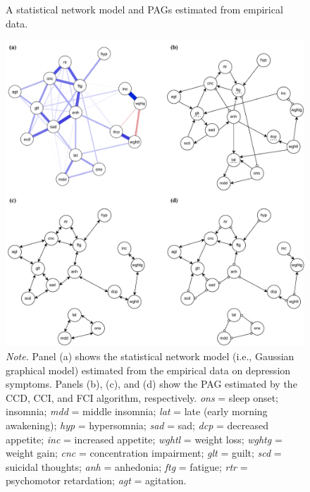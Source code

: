 \documentclass[twoside, 11pt]{article}
\begin{document}
\begin{figure}[!htbp]
    \centering
        \caption{A statistical network model and PAGs estimated from empirical data.}
        \vspace{1mm}
        \includegraphics[width=1\textwidth]{figures/Fig19.pdf}
        \vspace*{1mm}
        \caption*{\small{\textit{Note.} Panel (a) shows the statistical network model (i.e., Gaussian graphical model) estimated from the empirical data on depression symptoms. Panels (b), (c), and (d) show the PAG estimated by the CCD, CCI, and FCI algorithm, respectively. \textit{ons} = sleep onset; insomnia; \textit{mdd} = middle insomnia; \textit{lat} = late (early morning awakening); \textit{hyp} = hypersomnia; \textit{sad} = sad; \textit{dcp} = decreased appetite; \textit{inc} = increased appetite; \textit{wghtl} = weight loss; \textit{wghtg} = weight gain; \textit{cnc} = concentration impairment; \textit{glt} = guilt; \textit{scd} = suicidal thoughts; \textit{anh} = anhedonia; \textit{ftg} = fatigue; \textit{rtr} = psychomotor retardation; \textit{agt} = agitation.}}
    \label{fig:20}
\end{figure}
\end{document}
